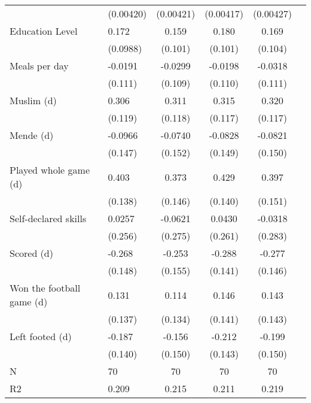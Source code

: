 {\begin{tabularx}{\textwidth}{Xl*{4}{c}}
                    &   (0.00420)         &   (0.00421)         &   (0.00417)         &   (0.00427)         \\
[1em]
Education Level     &       0.172\sym{*}  &       0.159         &       0.180\sym{*}  &       0.169         \\
                    &    (0.0988)         &     (0.101)         &     (0.101)         &     (0.104)         \\
[1em]
Meals per day       &     -0.0191         &     -0.0299         &     -0.0198         &     -0.0318         \\
                    &     (0.111)         &     (0.109)         &     (0.110)         &     (0.111)         \\
[1em]
Muslim (d)          &       0.306\sym{**} &       0.311\sym{***}&       0.315\sym{***}&       0.320\sym{***}\\
                    &     (0.119)         &     (0.118)         &     (0.117)         &     (0.117)         \\
[1em]
Mende (d)           &     -0.0966         &     -0.0740         &     -0.0828         &     -0.0821         \\
                    &     (0.147)         &     (0.152)         &     (0.149)         &     (0.150)         \\
[1em]
Played whole game (d)&       0.403\sym{***}&       0.373\sym{**} &       0.429\sym{***}&       0.397\sym{***}\\
                    &     (0.138)         &     (0.146)         &     (0.140)         &     (0.151)         \\
[1em]
Self-declared skills&      0.0257         &     -0.0621         &      0.0430         &     -0.0318         \\
                    &     (0.256)         &     (0.275)         &     (0.261)         &     (0.283)         \\
[1em]
Scored (d)          &      -0.268\sym{*}  &      -0.253         &      -0.288\sym{**} &      -0.277\sym{*}  \\
                    &     (0.148)         &     (0.155)         &     (0.141)         &     (0.146)         \\
[1em]
Won the football game (d)&       0.131         &       0.114         &       0.146         &       0.143         \\
                    &     (0.137)         &     (0.134)         &     (0.141)         &     (0.143)         \\
[1em]
Left footed (d)     &      -0.187         &      -0.156         &      -0.212         &      -0.199         \\
                    &     (0.140)         &     (0.150)         &     (0.143)         &     (0.150)         \\
\hline
N                   &          70         &          70         &          70         &          70         \\
R2                  &       0.209         &       0.215         &       0.211         &       0.219         \\
\hline\hline
\end{tabularx}
}
